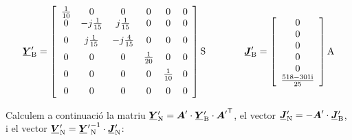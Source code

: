 \begin{exemple}
	\[
		\mcmplx{Y}'\ped{B} = 
		\begin{bmatrix}\begin{array}{cccccc} 
				\frac{1}{10} & 0 & 0 & 0 & 0  & 0\\
				0 & -j\frac{1}{15} & j\frac{1}{15} & 0 & 0  & 0\\[2mm]
				0 & j\frac{1}{15} & -j\frac{4}{15} & 0 & 0  & 0\\[2mm]
				0 & 0 & 0 & \frac{1}{20} & 0  & 0\\[2mm]
				0 & 0 & 0 & 0 & \frac{1}{10} & 0\\[2mm]
				0 & 0 & 0 & 0 & 0 & 0
		\end{array}\end{bmatrix}\unit{S} 
		\qquad\qquad
		\mcmplx{J}'\ped{B} = 
		\begin{bmatrix}\begin{array}{c}  
				0 \\ 0 \\ 0 \\ 0 \\ 0 \\ \frac{\complexnum{518-j301}}{25}
		\end{array}\end{bmatrix}\unit{A}
	\]	
	
	Calculem a continuació la matriu $\mcmplx{Y}'\ped{N} = \boldsymbol{A}' \cdot \mcmplx{Y}'\ped{B} \cdot \transpose{{\boldsymbol{A}'}}$, el vector $\mcmplx{J}'\ped{N} = - \boldsymbol{A}' \cdot\mcmplx{J}'\ped{B}$, i el vector 	$\mcmplx{V}'\ped{N} = {\mcmplx{Y}'}\ped{N}^{-1} \cdot \mcmplx{J}'\ped{N}$:
	

\end{exemple}
